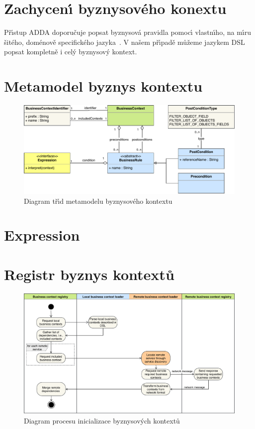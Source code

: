 \section{Zachycen\'{\i} byznysového konextu}

Př\'{\i}stup \gls{ADDA} doporučuje popsat byznysová pravidla pomoc\'{\i}
vlastn\'{\i}ho, na m\'{\i}ru šitého, doménově specifického jazyka~\cite{cemus2015automated}.
V našem př\'{\i}padě můžeme jazykem \gls{DSL} popsat kompletně i cel\'y
byznysov\'y kontext.

\section{Metamodel byznys kontextu}\label{sec:metamodel}

\begin{figure}
    \centering
    \includegraphics[keepaspectratio=true, width=\linewidth]{figures/business-context-metamodel.pdf}
    \caption{Diagram tř\'{\i}d metamodelu byznysového kontextu}
    \label{fig:business-context-metamodel}
\end{figure} %

\section{Expression}

\section{Registr byznys kontextů}

\begin{figure}
    \centering
    \includegraphics[keepaspectratio=true, width=0.8\linewidth]{figures/business-context-loading.pdf}
    \caption{Diagram procesu inicializace byznysov\'ych kontextů}
    \label{fig:business-context-loading}
\end{figure} %

